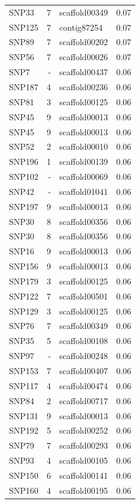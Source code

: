 \begin{longtable}{lrlr}
  SNP33 &   7 & scaffold00349 & 0.07 \\ 
  SNP125 &   7 & contig87254 & 0.07 \\ 
  SNP89 &   7 & scaffold00202 & 0.07 \\ 
  SNP56 &   7 & scaffold00026 & 0.07 \\ 
  SNP7 & - & scaffold00437 & 0.06 \\ 
  SNP187 &   4 & scaffold00236 & 0.06 \\ 
  SNP81 &   3 & scaffold00125 & 0.06 \\ 
  SNP45 &   9 & scaffold00013 & 0.06 \\ 
  SNP45 &   9 & scaffold00013 & 0.06 \\ 
  SNP52 &   2 & scaffold00010 & 0.06 \\ 
  SNP196 &   1 & scaffold00139 & 0.06 \\ 
  SNP102 & - & scaffold00069 & 0.06 \\ 
  SNP42 & - & scaffold01041 & 0.06 \\ 
  SNP197 &   9 & scaffold00013 & 0.06 \\ 
  SNP30 &   8 & scaffold00356 & 0.06 \\ 
  SNP30 &   8 & scaffold00356 & 0.06 \\ 
  SNP16 &   9 & scaffold00013 & 0.06 \\ 
  SNP156 &   9 & scaffold00013 & 0.06 \\ 
  SNP179 &   3 & scaffold00125 & 0.06 \\ 
  SNP122 &   7 & scaffold00501 & 0.06 \\ 
  SNP129 &   3 & scaffold00125 & 0.06 \\ 
  SNP76 &   7 & scaffold00349 & 0.06 \\ 
  SNP35 &   5 & scaffold00108 & 0.06 \\ 
  SNP97 & - & scaffold00248 & 0.06 \\ 
  SNP153 &   7 & scaffold00407 & 0.06 \\ 
  SNP117 &   4 & scaffold00474 & 0.06 \\ 
  SNP84 &   2 & scaffold00717 & 0.06 \\ 
  SNP131 &   9 & scaffold00013 & 0.06 \\ 
  SNP192 &   5 & scaffold00252 & 0.06 \\ 
  SNP79 &   7 & scaffold00293 & 0.06 \\ 
  SNP93 &   4 & scaffold00105 & 0.06 \\ 
  SNP150 &   6 & scaffold00141 & 0.06 \\ 
  SNP160 &   4 & scaffold00195 & 0.06 \\ 

\end{longtable}
